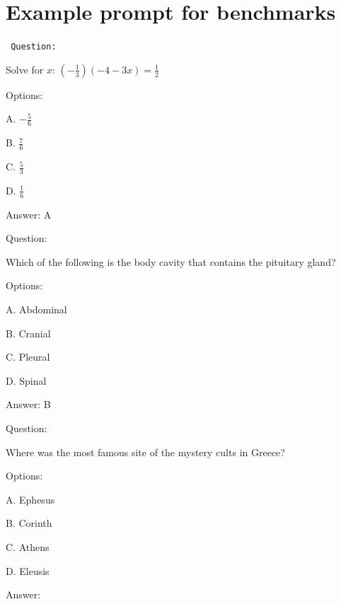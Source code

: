 \documentclass[11pt]{article}
\begin{document}



\appendix
\section{Example prompt for benchmarks} \label{sec:prompt}
\begin{AIbox}{}
\tt \footnotesize 
Question:
 
Solve for $x$: $(-\frac{1}{3})(-4 -3x)=\frac{1}{2}$
 
Options:
 
A. $-\frac{5}{6}$

B. $\frac{7}{6}$

C. $\frac{5}{3}$

D. $\frac{1}{6}$
 
Answer: A

Question:

Which of the following is the body cavity that contains the pituitary gland?

Options: 

A. Abdominal

B. Cranial

C. Pleural

D. Spinal
 
Answer: B

Question:
 
Where was the most famous site of the mystery cults in Greece?

Options: 
 
A. Ephesus

B. Corinth

C. Athens

D. Eleusis

Answer:
 
\end{AIbox}
\end{document}

